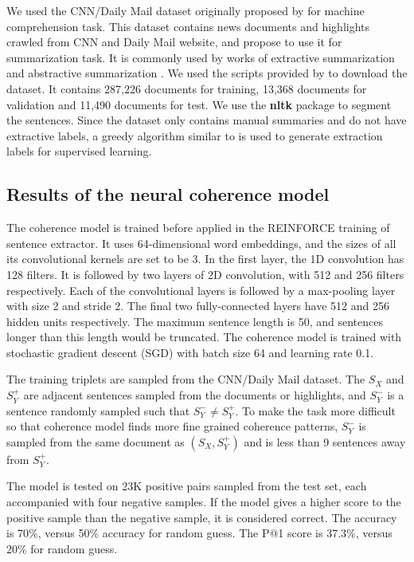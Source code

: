 \documentclass[letterpaper]{article} %
\begin{document}
	We used the CNN/Daily Mail dataset originally proposed by \cite{hermann_teaching_2015} for machine comprehension task. This dataset contains news documents and highlights crawled from CNN and Daily Mail website, and  \cite{nallapati_ramesh_abstractive_2016} propose to use it for summarization task. It is commonly used by works of extractive summarization \cite{jianpeng2016,SummaRuNNer} and abstractive summarization \cite{nallapati_ramesh_abstractive_2016,see_get_2017}. We used the scripts provided by \cite{hermann_teaching_2015} to download the dataset. It contains 287,226 documents for training, 13,368 documents for validation and 11,490 documents for test. We use the \textbf{nltk} package to segment the sentences. Since the dataset only contains manual summaries and do not have extractive labels, a greedy algorithm similar to \cite{SummaRuNNer} is used to generate extraction labels for supervised learning.
	 
	\subsection{Results of the neural coherence model}
	The coherence model is trained before applied in the REINFORCE training of sentence extractor. It uses 64-dimensional word embeddings, and the sizes of all its convolutional kernels are set to be 3. In the first layer, the 1D convolution has 128 filters. It is followed by two layers of 2D convolution, with 512 and 256 filters respectively. Each of the convolutional layers is followed by a max-pooling layer with size 2 and stride 2. The final two fully-connected layers have 512 and 256 hidden units respectively. The maximum sentence length is 50, and sentences longer than this length would be truncated. The coherence model is trained with stochastic gradient descent (SGD) with batch size 64 and learning rate 0.1. 
	
	The training triplets are sampled from the CNN/Daily Mail dataset. The $S_X$ and $S_Y^+$ are adjacent sentences sampled from the documents or highlights, and $S_Y^-$ is a sentence randomly sampled such that $S_Y^- \neq S_Y^+$. To make the task more difficult so that coherence model finds more fine grained coherence patterns, $S_Y^-$ is sampled from the same document as $(S_X, S_Y^+)$ and is less than 9 sentences away from $S_Y^+$.
	
	The model is tested on 23K positive pairs sampled from the test set, each accompanied with four negative samples. If the model gives a higher score to the positive sample than the negative sample, it is considered correct. The accuracy is 70\%, versus 50\% accuracy for random guess. The P@1 score is 37.3\%, versus 20\% for random guess.
	
\end{document}
